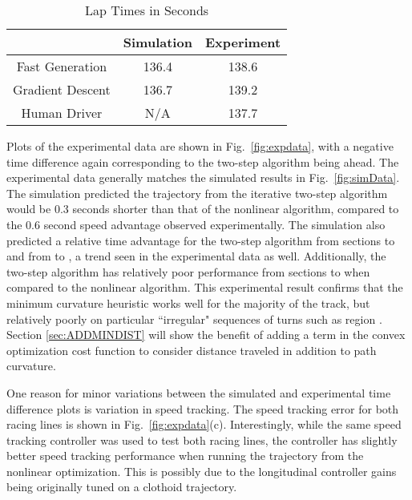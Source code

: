 \begin{table}[tb]
\begin{center}
\begin{tabular}{c|cc}
    & Simulation & Experiment \\\hline
Fast Generation& 136.4 & 138.6 \\
Gradient Descent&  136.7 & 139.2 \\
Human Driver& N/A & 137.7 \\\hline
\end{tabular}
\caption{Lap Times in Seconds}\label{tb:laptimes}
\end{center}
\end{table}
   
Plots of the experimental data are shown in Fig.~\ref{fig:expdata}, with a negative time difference again corresponding to the two-step algorithm being ahead.
The experimental data generally matches the simulated results in Fig.~\ref{fig:simData}. The simulation predicted the trajectory from the iterative two-step algorithm would be 0.3 seconds
 shorter than that of the nonlinear algorithm, compared to the 0.6 second speed advantage observed experimentally. 
 The simulation also predicted a relative time advantage for the two-step algorithm from sections  to 
 and from  to , a trend seen in the experimental data as well. Additionally, the
 two-step algorithm has relatively poor performance
 from sections  to  when compared to the nonlinear algorithm.  This experimental result
 confirms that the minimum curvature heuristic works well for the majority of the track, but relatively poorly on particular ``irregular" 
 sequences of turns such as region . Section \ref{sec:ADDMINDIST} will show the benefit of adding a term in the convex optimization
 cost function to consider distance traveled in addition to path curvature.
 
 One reason for minor variations between the simulated and experimental time difference plots is variation in speed tracking. 
 The speed tracking error for both racing lines is shown in Fig.~\ref{fig:expdata}(c). Interestingly, while the same speed tracking controller was used to test both racing lines, 
 the controller has slightly better speed tracking performance when running the trajectory from the nonlinear optimization. This is possibly due to the
 longitudinal controller gains being originally tuned on a clothoid trajectory. 

